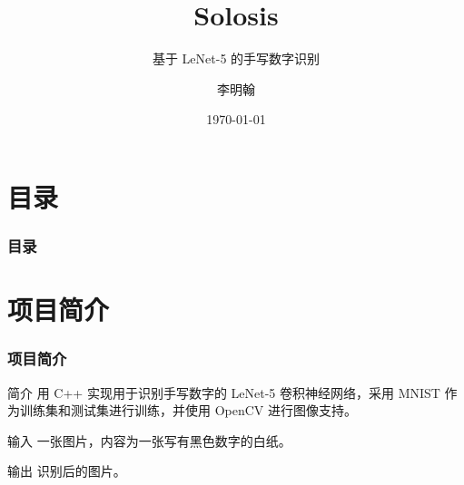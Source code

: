 \documentclass[10pt,aspectratio=43,serif]{beamer}
\title{Solosis}
\subtitle{基于 LeNet-5 的手写数字识别}
\author{李明翰}
\institute{数学与统计学院 2201 班, 华中科技大学}
\date{\today}
\begin{document}
\begin{frame}
    \titlepage
\end{frame} %

\section{目录}
\begin{frame}
    \frametitle{目录}
    \tableofcontents
\end{frame}

\section{项目简介}
\begin{frame}
    \frametitle{项目简介}
    \begin{block}{简介}
        用 C++ 实现用于识别手写数字的 LeNet-5 卷积神经网络，采用 MNIST 作为训练集和测试集进行训练，并使用 OpenCV 进行图像支持。        
    \end{block}
    
    \begin{block}{输入}
        一张图片，内容为一张写有黑色数字的白纸。
    \end{block}
    \begin{block}{输出}
        识别后的图片。
    \end{block}
\end{frame}
\end{document}
